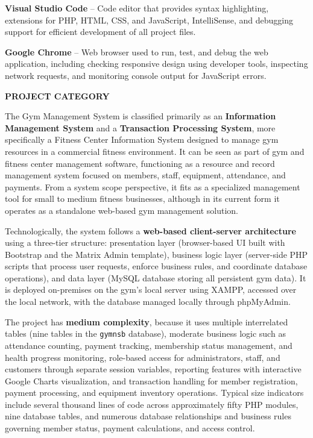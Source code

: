 \documentclass[12pt,a4paper]{report}
\begin{document}
\textbf{Visual Studio Code} -- Code editor that provides syntax highlighting, extensions for PHP, HTML, CSS, and JavaScript, IntelliSense, and debugging support for efficient development of all project files.

\textbf{Google Chrome} -- Web browser used to run, test, and debug the web application, including checking responsive design using developer tools, inspecting network requests, and monitoring console output for JavaScript errors.

\newpage
\vspace*{\fill}
\begin{center}
{\LARGE \textbf{PROJECT CATEGORY}}
\end{center}
\vspace*{\fill}

\newpage
The Gym Management System is classified primarily as an \textbf{Information Management System} and a \textbf{Transaction Processing System}, more specifically a Fitness Center Information System designed to manage gym resources in a commercial fitness environment. It can be seen as part of gym and fitness center management software, functioning as a resource and record management system focused on members, staff, equipment, attendance, and payments. From a system scope perspective, it fits as a specialized management tool for small to medium fitness businesses, although in its current form it operates as a standalone web-based gym management solution.

Technologically, the system follows a \textbf{web-based client-server architecture} using a three-tier structure: presentation layer (browser-based UI built with Bootstrap and the Matrix Admin template), business logic layer (server-side PHP scripts that process user requests, enforce business rules, and coordinate database operations), and data layer (MySQL database storing all persistent gym data). It is deployed on-premises on the gym's local server using XAMPP, accessed over the local network, with the database managed locally through phpMyAdmin.

The project has \textbf{medium complexity}, because it uses multiple interrelated tables (nine tables in the \texttt{gymnsb} database), moderate business logic such as attendance counting, payment tracking, membership status management, and health progress monitoring, role-based access for administrators, staff, and customers through separate session variables, reporting features with interactive Google Charts visualization, and transaction handling for member registration, payment processing, and equipment inventory operations. Typical size indicators include several thousand lines of code across approximately fifty PHP modules, nine database tables, and numerous database relationships and business rules governing member status, payment calculations, and access control.
\end{document}
